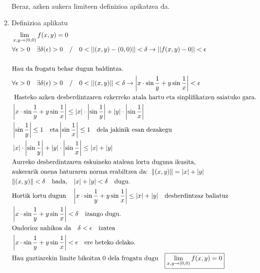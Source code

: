 \begin{enumerate}
    Beraz, azken aukera limiteen definizioa apikatzea da. 
    \item Definizioa aplikatu
    \begin{align*}
    &\lim_{x,y \to (0,0)}f(x,y)=0\\
    &\forall \epsilon >0 \quad \exists \delta(\epsilon)>0 \quad / \quad0<||(x,y)-(0,0)||<\delta \rightarrow ||f(x,y)-0||<\epsilon  \\
    \\
    &\text{Hau da frogatu behar dugun baldintza.}\\
    &\forall \epsilon >0 \quad \exists \delta(\epsilon)>0 \quad / \quad0<||(x,y)||<\delta \rightarrow \left|x\cdot \sin \frac{1}{y}+ y \sin \frac{1}{x}\right|<\epsilon  \\
    &\text{ Hasteko azken desberdintzaren ezkerreko atala hartu eta sinplifikatzen saiatuko gara.}\\
    &\left|x\cdot \sin \frac{1}{y}+ y \sin \frac{1}{x}\right|\leq\left| x\right|\cdot\left |\sin\frac{1}{y}\right |+\left|y\right|\cdot\left|\sin\frac{1}{x}\right|\\
    &\left|\sin\frac{1}{y}\right|\leq1 \quad\text{eta} \left|\sin\frac{1}{x}\right| \leq 1 \quad \text{dela jakinik esan dezakegu} \\
    & \left| x\right|\cdot\left |\sin\frac{1}{y}\right |+\left|y\right|\cdot\left|\sin\frac{1}{x}\right|\leq \abs{x}+\abs{y}\\
    &\text{Aurreko desberdintzaren eskuineko atalean lortu duguna ikusita,}\\
    &\text{aukerarik onena baturaren norma erabiltzea da:} \;\; \| (x,y) \| =\abs{x}+\abs{y}\ \\
    &\| (x,y)\| < \delta \quad \text{bada,} \quad | x | + | y | < \delta \quad \text{dugu.}\\
    &\text{Hortik lortu dugun}\quad\left|x\cdot \sin \frac{1}{y}+ y \sin \frac{1}{x}\right|\leq \abs{x}+\abs{y}\quad \text{desberdintzaz baliatuz}\\
    &\left|x\cdot \sin \frac{1}{y}+ y \sin \frac{1}{x}\right|< \delta\quad \text{izango dugu.}\\
    &\text{Ondorioz nahikoa da}\quad \delta < \epsilon \quad \text{izatea }\\
    &\left|x\cdot \sin \frac{1}{y}+ y \sin \frac{1}{x}\right| < \epsilon \quad \text{ere beteko delako.}\\
    &\text{Hau guztiarekin limite bikoitza 0 dela frogatu dugu} \quad \boxed{\lim_{x,y \to (0,0)}f(x,y)=0}
    \end{align*}
\end{enumerate}

